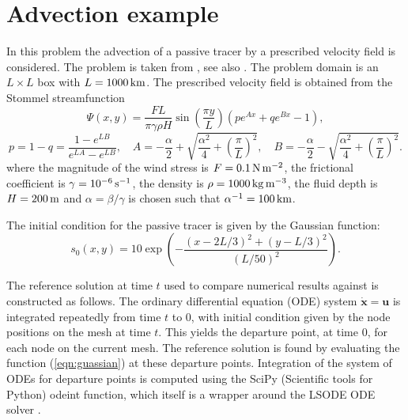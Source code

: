 
\section{Advection example}
\label{sect:advection}

In this problem the advection of a passive tracer by a prescribed velocity field is considered.
The problem is taken from \cite{hanert2004}, see also \cite{hecht2000}. The problem domain
is an $L\times L$ box with $L=\km[1000]$. The prescribed velocity field is obtained from the
Stommel streamfunction
\begin{equation*}
\Psi(x,y) = \frac{FL}{\pi \gamma \rho H}\sin\left(\frac{\pi y}{L}\right)\left(p e^{Ax} + q e^{Bx}-1\right),
\end{equation*}
\begin{equation*}
p = 1-q = \frac{1-e^{LB}}{e^{LA}-e^{LB}},\quad
A=-\frac{\alpha}{2}+\sqrt{\frac{\alpha^2}{4}+\left(\frac{\pi}{L}\right)^2},\quad
B=-\frac{\alpha}{2}-\sqrt{\frac{\alpha^2}{4}+\left(\frac{\pi}{L}\right)^2}.
\end{equation*}
where the magnitude of the wind stress is $F = \Nmm[0.1]$, the frictional
coefficient is $\gamma = \invs[10^{-6}]$, the density is $\rho = \kgmmm[1000]$, the
fluid depth is $H=\m[200]$ and $\alpha = \beta/\gamma$ is chosen such that $\alpha^{-1}=\km[100]$.

The initial condition for the passive tracer is given by the Gaussian function:
\begin{equation}
s_0(x,y) = 10\exp\left({-\frac{(x-2L/3)^2 + (y-L/3)^2}{(L/50)^2}}\right).
\label{eqn:guassian}
\end{equation}

The reference solution at time $t$ used to compare numerical results against
is constructed as follows.  The ordinary differential equation (ODE) system
$\dot{\pmb{x}}=\pmb{u}$ is integrated repeatedly from time $t$ to $0$, with
initial condition given by the node positions on the mesh at time $t$.  This
yields the departure point, at time $0$, for each node on the current mesh.
The reference solution is found by evaluating the function
(\ref{eqn:guassian}) at these departure points.  Integration of the system
of ODEs for departure points is computed using the SciPy (Scientific tools
for Python) odeint function, which itself is a wrapper around the LSODE ODE
solver \cite{hindmarsh1983}.

